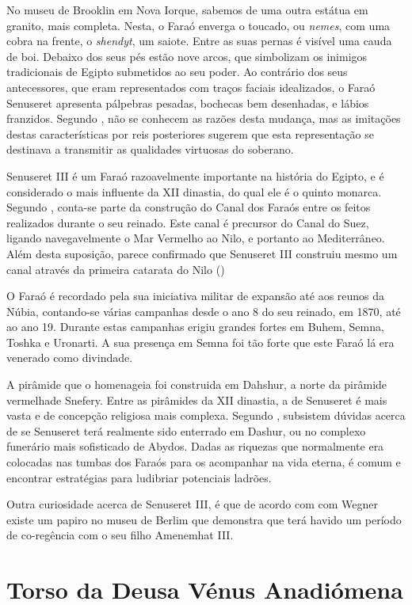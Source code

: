 \documentclass{article}
\begin{document}
No museu de Brooklin em Nova Iorque, sabemos de uma outra estátua em
granito, mais completa. Nesta, o Faraó enverga o toucado, ou
\emph{nemes}, com uma cobra na frente, o \emph{shendyt}, um
saiote. Entre as suas pernas é visível uma cauda de boi. Debaixo dos
seus pés estão nove arcos, que simbolizam os inimigos tradicionais de
Egipto submetidos ao seu poder. Ao contrário dos seus antecessores,
que eram representados com traços faciais idealizados, o Faraó
Senuseret apresenta pálpebras pesadas, bochecas bem desenhadas, e
lábios franzidos. Segundo \cite{wiki-senuseret}, não se conhecem as
razões desta mudança, mas as imitações destas características por reis
posteriores sugerem que esta representação se destinava a transmitir
as qualidades virtuosas do soberano.

Senuseret III é um Faraó razoavelmente importante na história do
Egipto, e é considerado o mais influente da XII dinastia, do qual ele
é o quinto monarca. Segundo \cite{wiki-senuseret}, conta-se parte da
construção do Canal dos Faraós entre os feitos realizados durante o
seu reinado. Este canal é precursor do Canal do Suez, ligando
navegavelmente o Mar Vermelho ao Nilo, e portanto ao
Mediterrâneo. Além desta suposição, parece confirmado que Senuseret
III construiu mesmo um canal através da primeira catarata do Nilo
(\cite{wiki-breasted})

O Faraó é recordado pela sua iniciativa militar de expansão até aos
reunos da Núbia, contando-se várias campanhas desde o ano 8 do seu
reinado, em 1870, até ao ano 19. Durante estas campanhas erigiu
grandes fortes em Buhem, Semna, Toshka e Uronarti. A sua presença em
Semna foi tão forte que este Faraó lá era venerado como divindade.

A pirâmide que o homenageia foi construida em Dahshur, a norte da
pirâmide vermelhade Snefery. Entre as pirâmides da XII dinastia, a de
Senuseret é mais vasta e de concepção religiosa mais complexa. Segundo
\cite{wiki-wegner}, subsistem dúvidas acerca de se Senuseret terá
realmente sido enterrado em Dashur, ou no complexo funerário mais
sofisticado de Abydos. Dadas as riquezas que normalmente era colocadas
nas tumbas dos Faraós para os acompanhar na vida eterna, é comum e
encontrar estratégias para ludibriar potenciais ladrões.

Outra curiosidade acerca de Senuseret III, é que de acordo com com
Wegner existe um papiro no museu de Berlim que demonstra que terá
havido um período de co-regência com o seu filho Amenemhat III.

\section{Torso da Deusa Vénus Anadiómena}
\end{document}
